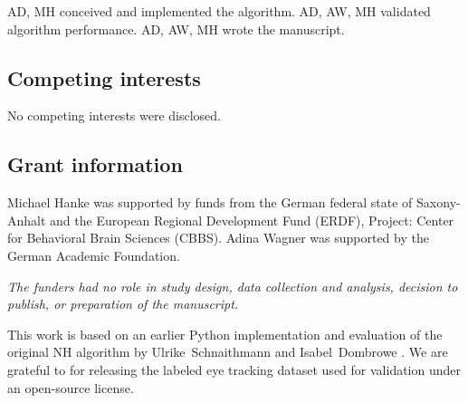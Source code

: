 AD, MH conceived and implemented the algorithm.
AD, AW, MH validated algorithm performance.
AD, AW, MH wrote the manuscript.

\subsection*{Competing interests}


No competing interests were disclosed.

\subsection*{Grant information}

Michael Hanke was supported by funds from the German federal state of
Saxony-Anhalt and the European Regional Development Fund (ERDF),
Project: Center for Behavioral Brain Sciences (CBBS).
Adina Wagner was supported by the German Academic Foundation.

\textit{The funders had no role in study design, data collection and analysis,
decision to publish, or preparation of the manuscript.}


\begin{acknowledgements}


This work is based on an earlier Python implementation and evaluation of the
original NH algorithm by Ulrike~Schnaithmann and Isabel~Dombrowe
\citep{Sch2017}.  We are grateful to \cite{Andersson2017} for releasing the
labeled eye tracking dataset used for validation under an open-source license.

\end{acknowledgements}

